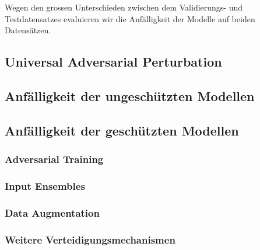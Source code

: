 Wegen den grossen Unterschieden zwischen dem Validierungs- und Testdatensatzes evaluieren wir die Anfälligkeit der Modelle auf beiden Datensätzen.

\newpage

\subsection{Universal Adversarial Perturbation}

\subsection{Anfälligkeit der ungeschützten Modellen}

\subsection{Anfälligkeit der geschützten Modellen}


\subsubsection{Adversarial Training}

\subsubsection{Input Ensembles}


\subsubsection{Data Augmentation}

\subsubsection{Weitere Verteidigungsmechanismen}



